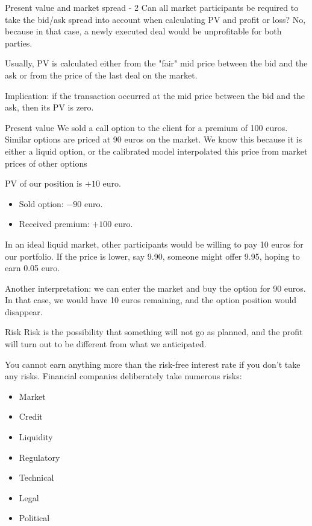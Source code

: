 \documentclass{beamer}
\begin{document}
\begin{frame}{Present value and market spread - 2}
\justify
Can all market participants be required to take the bid/ask spread into account when calculating PV and profit or loss? No, because in that case, a newly executed deal would be unprofitable for both parties.

\justify
Usually, PV is calculated either from the "fair" mid price between the bid and the ask or from the price of the last deal on the market.

\justify
Implication: if the transaction occurred at the mid price between the bid and the ask, then its PV is zero.
\end{frame}



\begin{frame}{Present value}
\justify
We sold a call option to the client for a premium of 100 euros. Similar options are priced at 90 euros on the market. We know this because it is either a liquid option, or the calibrated model interpolated this price from market prices of other options

\justify
PV of our position is $+10$ euro.
\begin{itemize}
\item Sold option: $-90$ euro.
\item Received premium: $+100$ euro.
\end{itemize}

\justify
In an ideal liquid market, other participants would be willing to pay 10 euros for our portfolio. If the price is lower, say 9.90, someone might offer 9.95, hoping to earn 0.05 euro.

\justify
Another interpretation: we can enter the market and buy the option for 90 euros. In that case, we would have 10 euros remaining, and the option position would disappear.
\end{frame}



\begin{frame}{Risk}
\justify
\alert{Risk} is the possibility that something will not go as planned, and the profit will turn out to be different from what we anticipated.

\justify
You cannot earn anything more than the risk-free interest rate if you don't take any risks. Financial companies deliberately take numerous risks:

\begin{itemize}
\item Market
\item Credit
\item Liquidity
\item Regulatory
\item Technical
\item Legal
\item Political
\end{itemize}
\end{frame}
\end{document}
